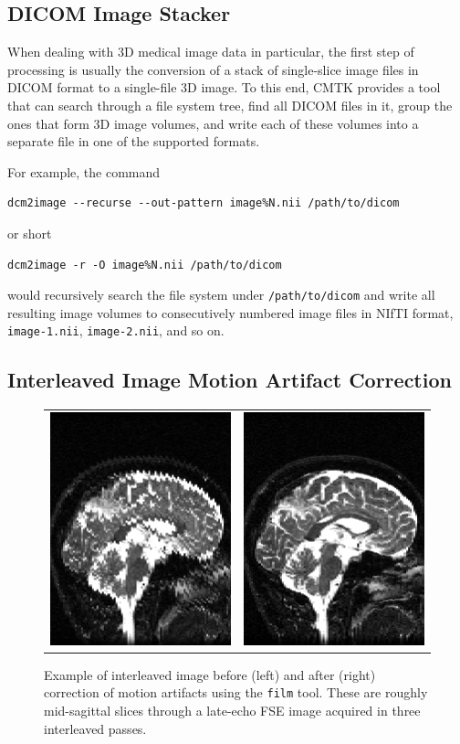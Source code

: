 \documentclass{InsightArticle}
\begin{document}
\subsection{DICOM Image Stacker}

When dealing with 3D medical image data in particular, the first step of
processing is usually the conversion of a stack of single-slice image files in
DICOM format to a single-file 3D image. To this end, CMTK provides a tool that
can search through a file system tree, find all DICOM files in it, group the
ones that form 3D image volumes, and write each of these volumes into a
separate file in one of the supported formats.

For example, the command
\begin{verbatim}
dcm2image --recurse --out-pattern image%N.nii /path/to/dicom
\end{verbatim}
or short
\begin{verbatim}
dcm2image -r -O image%N.nii /path/to/dicom
\end{verbatim}
would recursively search the file system under {\tt /path/to/dicom} and write
all resulting image volumes to consecutively numbered image files in NIfTI
format, {\tt image-1.nii},  {\tt image-2.nii}, and so on.

\subsection{Interleaved Image Motion Artifact Correction}

\begin{figure}[tbp]
\begin{center}
\begin{tabular}{cc}
\includegraphics[width=.3\linewidth]{img/film_artifacts}&
\includegraphics[width=.3\linewidth]{img/film_corrected}
\end{tabular}
\end{center}
\caption{Example of interleaved image before (left) and after (right)
  correction of motion artifacts using the {\tt film} tool. These are roughly
  mid-sagittal slices through a late-echo FSE image acquired in three
  interleaved passes.}
\label{fig:InterleavedExample}
\end{figure}
\end{document}
